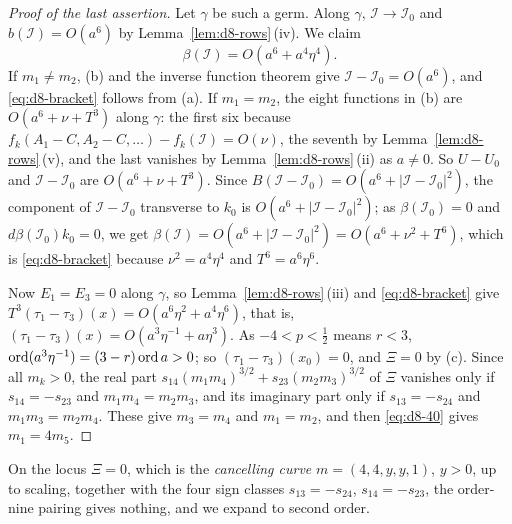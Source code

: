 \begin{proof}[Proof of the last assertion]
Let $\gamma$ be such a germ.  Along $\gamma$, $\mathcal I\to\mathcal I_0$ and
$b(\mathcal I)=O(a^6)$ by Lemma~\ref{lem:d8-rows}\,(iv).  We claim
\begin{equation}\label{eq:d8-bracket}
  \beta(\mathcal I)=O(a^6+a^4\eta^4).
\end{equation}
If $m_1\ne m_2$, (b) and the inverse function theorem give $\mathcal I-\mathcal I_0=O(a^6)$, and
\eqref{eq:d8-bracket} follows from (a).  If $m_1=m_2$, the eight functions in (b) are
$O(a^6+\nu+T^3)$ along $\gamma$: the first six because
$f_k(A_1-C,A_2-C,\dots)-f_k(\mathcal I)=O(\nu)$, the seventh by Lemma~\ref{lem:d8-rows}\,(v),
and the last vanishes by Lemma~\ref{lem:d8-rows}\,(ii) as $a\ne0$.  So $U-U_0$ and
$\mathcal I-\mathcal I_0$ are $O(a^6+\nu+T^3)$.  Since
$B(\mathcal I-\mathcal I_0)=O(a^6+|\mathcal I-\mathcal I_0|^2)$, the component of
$\mathcal I-\mathcal I_0$ transverse to $k_0$ is $O(a^6+|\mathcal I-\mathcal I_0|^2)$; as
$\beta(\mathcal I_0)=0$ and $d\beta(\mathcal I_0)k_0=0$, we get
$\beta(\mathcal I)=O(a^6+|\mathcal I-\mathcal I_0|^2)=O(a^6+\nu^2+T^6)$, which is
\eqref{eq:d8-bracket} because $\nu^2=a^4\eta^4$ and $T^6=a^6\eta^6$.

Now $E_1=E_3=0$ along $\gamma$, so Lemma~\ref{lem:d8-rows}\,(iii) and \eqref{eq:d8-bracket}
give $T^3(\tau_1-\tau_3)(x)=O(a^6\eta^2+a^4\eta^6)$, that is,
$(\tau_1-\tau_3)(x)=O(a^3\eta^{-1}+a\eta^3)$.  As $-4<p<\frac12$ means $r<3$,
$\operatorname{ord}(a^3\eta^{-1})=(3-r)\operatorname{ord} a>0$; so $(\tau_1-\tau_3)(x_0)=0$, and $\Xi=0$ by (c).  Since all
$m_k>0$, the real part $s_{14}(m_1m_4)^{3/2}+s_{23}(m_2m_3)^{3/2}$ of $\Xi$ vanishes only if
$s_{14}=-s_{23}$ and $m_1m_4=m_2m_3$, and its imaginary part only if $s_{13}=-s_{24}$ and
$m_1m_3=m_2m_4$.  These give $m_3=m_4$ and $m_1=m_2$, and then \eqref{eq:d8-40} gives
$m_1=4m_5$.
\end{proof}

On the locus $\Xi=0$, which is the \emph{cancelling curve} $m=(4,4,y,y,1)$, $y>0$, up to
scaling, together with the four sign classes $s_{13}=-s_{24}$, $s_{14}=-s_{23}$, the order-nine
pairing gives nothing, and we expand to second order.


